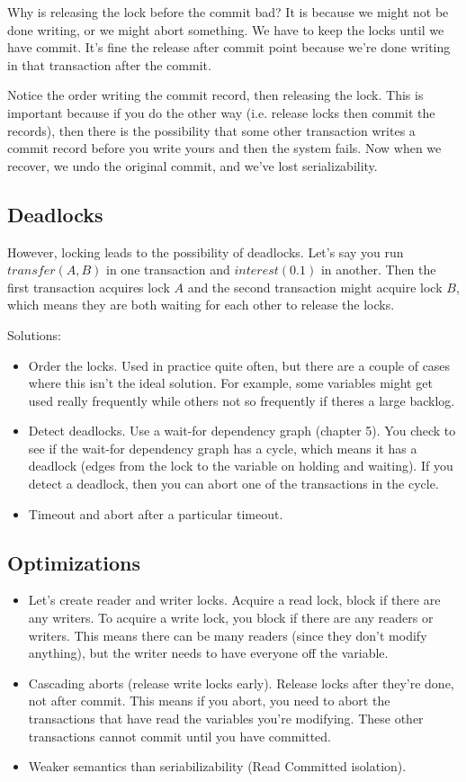 \documentclass[psamsfonts]{amsart}
\begin{document}
Why is releasing the lock before the commit bad? It is because we might not be done writing, or we might abort something. We have to keep the locks until we have commit. It's fine the release after commit point because we're done writing in that transaction after the commit. 

Notice the order writing the commit record, then releasing the lock. This is important because if you do the other way (i.e. release locks then commit the records), then there is the possibility that some other transaction writes a commit record before you write yours and then the system fails. Now when we recover, we undo the original commit, and we've lost serializability.

\subsection{Deadlocks}

However, locking leads to the possibility of deadlocks. Let's say you run $transfer(A,B)$ in one transaction and $interest(0.1)$ in another. Then the first transaction acquires lock $A$ and the second transaction might acquire lock $B$, which means they are both waiting for each other to release the locks.

Solutions:
\begin{itemize}
  \item Order the locks. Used in practice quite often, but there are a couple of cases where this isn't the ideal solution. For example, some variables might get used really frequently while others not so frequently if theres a large backlog.
  \item Detect deadlocks. Use a wait-for dependency graph (chapter 5). You check to see if the wait-for dependency graph has a cycle, which means it has a deadlock (edges from the lock to the variable on holding and waiting). If you detect a deadlock, then you can abort one of the transactions in the cycle.
  \item Timeout and abort after a particular timeout.
\end{itemize}

\subsection{Optimizations}

\begin{itemize}
  \item Let's create reader and writer locks. Acquire a read lock, block if there are any writers. To acquire a write lock, you block if there are any readers or writers. This means there can be many readers (since they don't modify anything), but the writer needs to have everyone off the variable.
  \item Cascading aborts (release write locks early). Release locks after they're done, not after commit. This means if you abort, you need to abort the transactions that have read the variables you're modifying. These other transactions cannot commit until you have committed.
  \item Weaker semantics than seriabilizability (Read Committed isolation).
\end{itemize}
\end{document}
